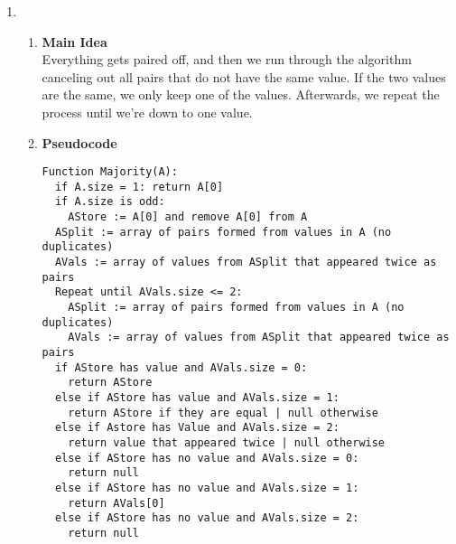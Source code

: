 \documentclass[11pt]{article}
\newenvironment{qparts}{\begin{enumerate}[{(}a{)}]}{\end{enumerate}}
\begin{document}
\begin{qparts}
\begin{qparts}
\begin{qparts}
		This will recurse until it finally return a majority or a null as an answer, where null means there's no majority. 
		
	\end{qparts}
	
	\item[] \textbf{Running Time Analysis} \\
	$\Theta(nlogn)$
	
	\item[] \textbf{Justification} \\
	Because we split the problem continuously into two's until we reach n = 1, therefore $T(n) = 2T(n/2) + \Theta(n)$. There is a $\Theta(n)$ on every level because we are doing a comparison on every level to see which one has the higher value. Using Master Theorem, the equation above shows that run time is $\Theta(nlogn)$.
	
\end{qparts}

	\item	
	\begin{qparts}
	\item[] \textbf{Main Idea} \\
		 Everything gets paired off, and then we run through the algorithm canceling out all pairs that do not have the same value. If the two values are the same, we only keep one of the values. Afterwards, we repeat the process until we're down to one value. 
	\item[] \textbf{Pseudocode} \\
		\begin{minipage}{\linewidth}
		\begin{lstlisting}
Function Majority(A):
  if A.size = 1: return A[0]
  if A.size is odd: 
    AStore := A[0] and remove A[0] from A
  ASplit := array of pairs formed from values in A (no duplicates)
  AVals := array of values from ASplit that appeared twice as pairs
  Repeat until AVals.size <= 2: 
    ASplit := array of pairs formed from values in A (no duplicates)
    AVals := array of values from ASplit that appeared twice as pairs
  if AStore has value and AVals.size = 0:
    return AStore
  else if AStore has value and AVals.size = 1:
    return AStore if they are equal | null otherwise
  else if Astore has Value and AVals.size = 2:
    return value that appeared twice | null otherwise
  else if AStore has no value and AVals.size = 0:
    return null
  else if AStore has no value and AVals.size = 1:
    return AVals[0]
  else if AStore has no value and AVals.size = 2:
    return null
  

\end{lstlisting}
\end{minipage}
\end{qparts}
\end{qparts}
\end{document}

